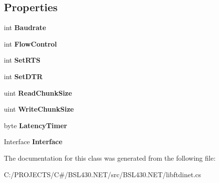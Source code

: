 \subsection*{Properties}
\begin{DoxyCompactItemize}
\item 
\mbox{\label{classlibftdinet_1_1_f_t_d_i_context_a8d989e43aeafc647d52b5a2aa87833c8}} 
int {\bfseries Baudrate}
\item 
\mbox{\label{classlibftdinet_1_1_f_t_d_i_context_aed62e7be0f941e52e4e520e6f68933e6}} 
int {\bfseries Flow\+Control}
\item 
\mbox{\label{classlibftdinet_1_1_f_t_d_i_context_ad085649aeef72cdf1fa31b8495abd436}} 
int {\bfseries Set\+R\+TS}
\item 
\mbox{\label{classlibftdinet_1_1_f_t_d_i_context_acea2a4991051f1a6c6f63ec502889d43}} 
int {\bfseries Set\+D\+TR}
\item 
\mbox{\label{classlibftdinet_1_1_f_t_d_i_context_a48a0d2bac4112002574d5df4c890e05d}} 
uint {\bfseries Read\+Chunk\+Size}
\item 
\mbox{\label{classlibftdinet_1_1_f_t_d_i_context_a28e58b281c06f64c9e1114e0e3337f4c}} 
uint {\bfseries Write\+Chunk\+Size}
\item 
\mbox{\label{classlibftdinet_1_1_f_t_d_i_context_a0de4fc0fffc291ac6a2a137b8b9bd8d6}} 
byte {\bfseries Latency\+Timer}
\item 
\mbox{\label{classlibftdinet_1_1_f_t_d_i_context_a6f6917a1d235eb7d38ba99b5be5c56e5}} 
Interface {\bfseries Interface}
\end{DoxyCompactItemize}


The documentation for this class was generated from the following file\+:\begin{DoxyCompactItemize}
\item 
C\+:/\+P\+R\+O\+J\+E\+C\+T\+S/\+C\#/\+B\+S\+L430.\+N\+E\+T/src/\+B\+S\+L430.\+N\+E\+T/libftdinet.\+cs\end{DoxyCompactItemize}
